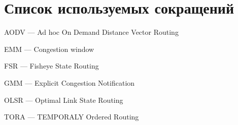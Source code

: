 \chapter*{Список используемых сокращений}

\mbox{}


AODV --- Ad hoc On Demand Distance Vector Routing 

EMM --- Congestion window 

FSR ---  Fisheye State Routing

GMM --- Explicit Congestion Notification

OLSR --- Optimal Link State Routing

TORA --- TEMPORALY Ordered Routing 

